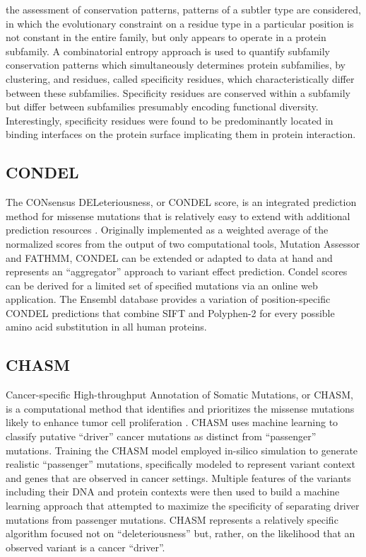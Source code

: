 \documentclass{article}
\begin{document}
the assessment of conservation patterns, patterns of a subtler type
are considered, in which the evolutionary constraint on a residue type
in a particular position is not constant in the entire family, but
only appears to operate in a protein subfamily. A combinatorial
entropy approach is used to quantify subfamily conservation patterns
which simultaneously determines protein subfamilies, by clustering,
and residues, called specificity residues, which characteristically
differ between these subfamilies. Specificity residues are conserved
within a subfamily but differ between subfamilies presumably encoding
functional diversity. Interestingly, specificity residues were found
to be predominantly located in binding interfaces on the protein
surface implicating them in protein interaction.

\subsection{CONDEL}

The CONsensus DELeteriousness, or CONDEL score, is an integrated
prediction method for missense mutations that is relatively easy to
extend with additional prediction resources
\cite{Gonzalez-Perez2011-gc}. Originally implemented as a weighted
average of the normalized scores from the output of two computational
tools, Mutation Assessor and FATHMM, CONDEL can be extended or adapted
to data at hand and represents an ``aggregator'' approach to variant
effect prediction.  Condel scores can be derived for a limited set of
specified mutations via an online web application. The Ensembl
database provides a variation of position-specific CONDEL predictions
that combine SIFT and Polyphen-2 for every possible amino acid
substitution in all human proteins.

\subsection{CHASM}

Cancer-specific High-throughput Annotation of Somatic Mutations, or
CHASM, is a computational method that identifies and prioritizes the
missense mutations likely to enhance tumor cell proliferation
\cite{Carter2009-ci}. CHASM uses machine learning to classify putative
``driver'' cancer mutations as distinct from ``passenger''
mutations. Training the CHASM model employed in-silico simulation to
generate realistic ``passenger'' mutations, specifically modeled to
represent variant context and genes that are observed in cancer
settings. Multiple features of the variants including their DNA and protein
contexts were then used to build a machine learning approach that
attempted to maximize the specificity of separating driver mutations
from passenger mutations. CHASM represents a relatively specific
algorithm focused not on ``deleteriousness'' but, rather, on the
likelihood that an observed variant is a cancer ``driver''.
\end{document}
